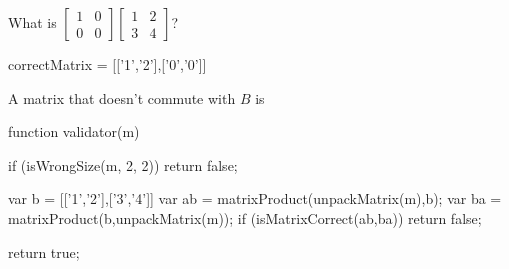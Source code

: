 \documentclass{ximera}
\begin{document}
\begin{question}
\begin{solution}
\begin{hint}
\begin{question}
\begin{solution}
\begin{hint}
  				\end{hint}
  				What is $\begin{bmatrix}  1 &0 \\ 0&0\end{bmatrix} \begin{bmatrix} 1 & 2 \\ 3 & 4 \end{bmatrix}$?
  					\begin{matrix-answer}[name=A]
  						correctMatrix = [['1','2'],['0','0']]
  					\end{matrix-answer}
  			\end{solution}
  		\end{question}
  	\end{hint}
  	
    A matrix that doesn't commute with $B$ is 
    \begin{matrix-answer}[name=A]
    function validator(m) {
      if (isWrongSize(m, 2, 2)) return false;
      
      var b = [['1','2'],['3','4']]
      var ab = matrixProduct(unpackMatrix(m),b);
      var ba = matrixProduct(b,unpackMatrix(m));
      if (isMatrixCorrect(ab,ba))
        return false;

      return true;
    }
    \end{matrix-answer}  
  \end{solution}
\end{question}
	
\end{document}
